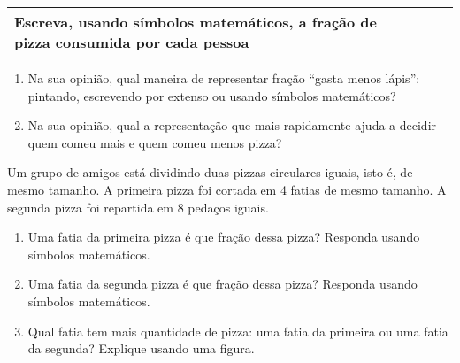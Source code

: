 \begin{atividade}{}
\begin{center}
\begin{tabular}{|>{\centering} m{}|b{}|b{}|b{}|b{}|}
    \hline
     Escreva, usando símbolos ma\-temáticos, a fração de pizza consumida por cada pessoa &                                        &                                        &                                         &                                        \\
    \hline
  \end{tabular}
\end{center}

\begin{enumerate}  %
  \item Na sua opinião, qual maneira de representar fração ``gasta menos lápis'': pintando, escrevendo por extenso ou usando símbolos matemáticos?
  \item Na sua opinião, qual a representação que mais rapidamente ajuda a decidir quem comeu mais e quem comeu menos pizza?
\end{enumerate} %
\end{atividade}

\begin{atividade}{}\label{chap2-ativ7}
Um grupo de amigos está dividindo duas pizzas circulares iguais, isto é, de mesmo tamanho. A primeira pizza foi cortada em 4 fatias de mesmo tamanho. A segunda pizza foi repartida em 8 pedaços iguais.
\begin{enumerate}  %
\item Uma fatia da primeira pizza é que fração dessa pizza? Responda usando símbolos matemáticos.
\item Uma fatia da segunda pizza é que fração dessa pizza? Responda usando símbolos matemáticos.
\item Qual fatia tem mais quantidade de pizza: uma fatia da primeira ou uma fatia da segunda? Explique usando uma figura.
\end{enumerate} %
\end{atividade}

